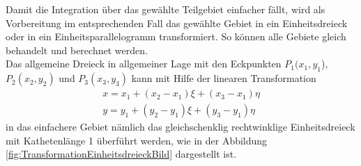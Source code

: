 Damit die Integration über das gewählte Teilgebiet einfacher fällt, wird als Vorbereitung im entsprechenden Fall das gewählte Gebiet in ein Einheitsdreieck oder in ein Einheitsparallelogramm transformiert. So können alle Gebiete gleich behandelt und berechnet werden. \\
Das allgemeine Dreieck in allgemeiner Lage mit den Eckpunkten $P_1(x_1, y_1$), $ P_2(x_2, y_2)$ und $P_3(x_3,y_3)$ kann mit Hilfe der linearen Transformation
\begin{equation}
	\begin{split}
		x = x_1 + (x_2 - x_1)\xi + (x_3 - x_1)\eta \\
		y = y_1 + (y_2 - y_1)\xi + (y_3 - y_1)\eta
		\label{fem:linTransformation}
	\end{split}
\end{equation}
in das einfachere Gebiet nämlich das gleichschenklig rechtwinklige Einheitsdreieck mit Kathetenlänge 1 überführt werden, wie in der Abbildung \ref{fig:TransformationEinheitsdreieckBild} dargestellt ist.

